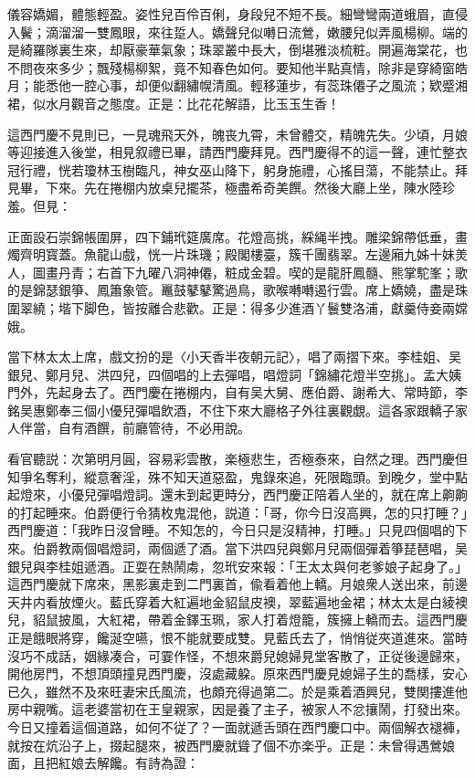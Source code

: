 儀容嬌媚，體態輕盈。姿性兒百伶百俐，身段兒不短不長。細彎彎兩道蛾眉，直侵入鬢；滴溜溜一雙鳳眼，來往踅人。嬌聲兒似囀日流鶯，嫩腰兒似弄風楊柳。端的是綺羅隊裏生來，却厭豪華氣象；珠翠叢中長大，倒堪雅淡梳粧。開遍海棠花，也不問夜來多少；飄殘楊柳絮，竟不知春色如何。要知他半點真情，除非是穿綺窗皓月；能悉他一腔心事，却便似翻繡幌清風。輕移蓮步，有蕊珠僊子之風流；欵蹙湘裙，似水月觀音之態度。正是：比花花解語，比玉玉生香！

這西門慶不見則已，一見魂飛天外，魄丧九霄，未曾體交，精魄先失。少頃，月娘等迎接進入後堂，相見叙禮已畢，請西門慶拜見。西門慶得不的這一聲，連忙整衣冠行禮，恍若瓊林玉樹臨凡，神女巫山降下，躬身施禮，心搖目蕩，不能禁止。拜見畢，下來。先在捲棚内放桌兒擺茶，極盡希奇美饌。然後大廳上坐，陳水陸珍羞。但見：

正面設石崇錦帳圍屏，四下鋪玳筵廣席。花燈高挑，綵䋲半拽。雕梁錦帶低垂，畫燭齊明寳蓋。魚龍山戲，恍一片珠璣；殿閣樓臺，簇千團翡翠。左邊廂九姊十妹羙人，圖畫丹青；右首下九曜八洞神僊，粧成金碧。喫的是龍肝鳳髓、熊掌駝峯；歌的是錦瑟銀箏、鳳簫象管。鼉鼓鼕鼕驚過鳥，歌喉囀囀遏行雲。席上嬌嬈，盡是珠圍翠繞；堦下脚色，皆按離合悲歡。正是：得多少進酒丫鬟雙洛浦，獻羹侍妾兩嫦娥。

當下林太太上席，戲文扮的是〈小天香半夜朝元記〉，唱了兩摺下來。李桂姐、吴銀兒、鄭月兒、洪四兒，四個唱的上去彈唱，唱燈詞「錦繡花燈半空挑」。孟大姨門外，先起身去了。西門慶在捲棚内，自有吴大舅、應伯爵、謝希大、常時節，李銘吴惠鄭奉三個小優兒彈唱飲酒，不住下來大廳格子外往裏觀覷。這各家跟轎子家人伴當，自有酒饌，前廳管待，不必用說。

看官聽説：次第明月圓，容易彩雲散，楽極悲生，否極泰來，自然之理。西門慶但知爭名奪利，縱意奢淫，殊不知天道惡盈，鬼錄來追，死限臨頭。到晚夕，堂中點起燈來，小優兒彈唱燈詞。還未到起更時分，西門慶正陪着人坐的，就在席上齁齁的打起睡來。伯爵便行令猜枚鬼混他，説道：「哥，你今日沒高興，怎的只打睡？」西門慶道：「我昨日沒曾睡。不知怎的，今日只是沒精神，打睡。」只見四個唱的下來。伯爵教兩個唱燈詞，兩個遞了酒。當下洪四兒與鄭月兒兩個彈着箏琵琶唱，吴銀兒與李桂姐遞酒。正耍在熱鬧䖏，忽玳安來報：「王太太與何老爹娘子起身了。」這西門慶就下席來，黑影裏走到二門裏首，偸看着他上轎。月娘衆人送出來，前邊天井内看放煙火。藍氏穿着大紅遍地金貂鼠皮襖，翠藍遍地金裙；林太太是白綾襖兒，貂鼠披風，大紅裙，帶着金鐸玉珮，家人打着燈籠，簇擁上轎而去。這西門慶正是餓眼將穿，饞涎空嚥，恨不能就要成雙。見藍氏去了，悄悄従夾道進來。當時沒巧不成話，姻緣凑合，可霎作怪，不想來爵兒媳婦見堂客散了，正従後邊歸來，開他房門，不想頂頭撞見西門慶，沒處藏躱。原來西門慶見媳婦子生的喬樣，安心已久，雖然不及來旺妻宋氏風流，也頗充得過第二。於是乘着酒興兒，雙関摟進他房中親嘴。這老婆當初在王皇親家，因是養了主子，被家人不忿攘鬧，打發出來。今日又撞着這個道路，如何不従了？一面就遞舌頭在西門慶口中。兩個解衣褪褲，就按在炕沿子上，掇起腿來，被西門慶就聳了個不亦楽乎。正是：未曾得遇鶯娘面，且把紅娘去解饞。有詩為證：

